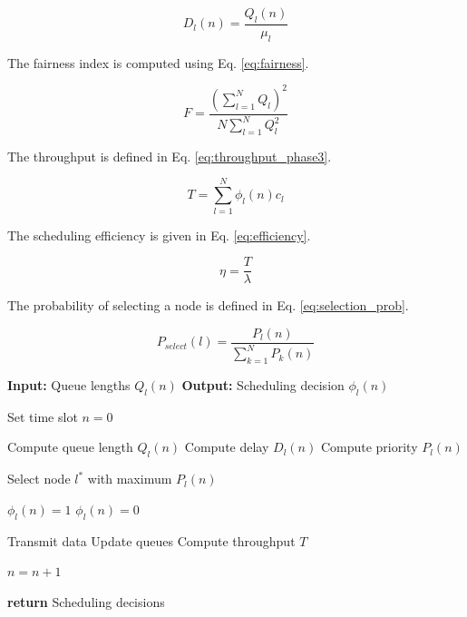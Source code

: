 \documentclass[a4paper,fleqn]{cas-dc}
\numberwithin{equation}{section}
\begin{document}
\begin{equation}
D_l(n) = \frac{Q_l(n)}{\mu_l}
\label{eq:delay_metric}
\end{equation}

The fairness index is computed using Eq. \ref{eq:fairness}.

\begin{equation}
F = \frac{(\sum_{l=1}^{N} Q_l)^2}{N \sum_{l=1}^{N} Q_l^2}
\label{eq:fairness}
\end{equation}

The throughput is defined in Eq. \ref{eq:throughput_phase3}.

\begin{equation}
T = \sum_{l=1}^{N} \phi_l(n) c_l
\label{eq:throughput_phase3}
\end{equation}

The scheduling efficiency is given in Eq. \ref{eq:efficiency}.

\begin{equation}
\eta = \frac{T}{\lambda}
\label{eq:efficiency}
\end{equation}

The probability of selecting a node is defined in Eq. \ref{eq:selection_prob}.

\begin{equation}
P_{select}(l) = \frac{P_l(n)}{\sum_{k=1}^{N} P_k(n)}
\label{eq:selection_prob}
\end{equation}

\begin{algorithm}
\caption{Phase 3: Scheduling Decision (MAC Layer)}
\begin{algorithmic}

\STATE \textbf{Input:} Queue lengths $Q_l(n)$
\STATE \textbf{Output:} Scheduling decision $\phi_l(n)$

\STATE Set time slot $n = 0$


        \STATE Compute queue length $Q_l(n)$
        \STATE Compute delay $D_l(n)$
        \STATE Compute priority $P_l(n)$
    \ENDFOR

    \STATE Select node $l^*$ with maximum $P_l(n)$

            \STATE $\phi_l(n) = 1$
        \ELSE
            \STATE $\phi_l(n) = 0$
        \ENDIF
    \ENDFOR

    \STATE Transmit data
    \STATE Update queues
    \STATE Compute throughput $T$

    \STATE $n = n + 1$

\ENDWHILE

\STATE \textbf{return} Scheduling decisions

\end{algorithmic}
\end{algorithm}
\end{document}
